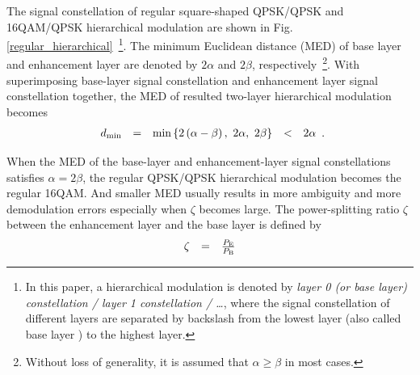 \documentclass[conference]{IEEEtran}
\begin{document}
The signal constellation of regular square-shaped QPSK/QPSK and
16QAM/QPSK hierarchical modulation are shown in Fig.
\ref{regular_hierarchical}~\footnote{In this paper, a hierarchical
modulation is denoted by {\em layer 0 (or base layer)
constellation / layer 1 constellation / \ldots}, where the signal
constellation of different layers are separated by backslash from
the lowest layer (also called base layer ) to the highest layer.
}. The minimum Euclidean distance (MED) of base layer and
enhancement layer are denoted by $2\alpha$ and $2\beta$,
respectively~\footnote{Without loss of generality, it is assumed
that $\alpha\geq\beta$ in most cases.}. With superimposing
base-layer signal constellation and enhancement layer signal
constellation together, the MED of resulted two-layer hierarchical
modulation becomes
\begin{equation}
\begin{array}{rcccl}
d_{\rm min}& = & \min\left\{2\left(\alpha-\beta\right),\ 2\alpha,\
2\beta\right\}&<& 2\alpha
\end{array}.\label{Regular_MED}
\end{equation}
\begin{figure}
\end{figure}
\noindent When the MED of the base-layer and enhancement-layer
signal constellations satisfies $\alpha=2\beta$, the regular
QPSK/QPSK hierarchical modulation becomes the regular 16QAM. And
smaller MED usually results in more ambiguity and more
demodulation errors especially when $\zeta$ becomes large. The
power-splitting ratio $\zeta$ between the enhancement layer and
the base layer is defined by
\begin{equation}
\begin{array}{rcl}
\zeta & = & \frac{P_{\rm E}}{P_{\rm B}}
\end{array}\label{power_ratio}
\end{equation}
\end{document}
